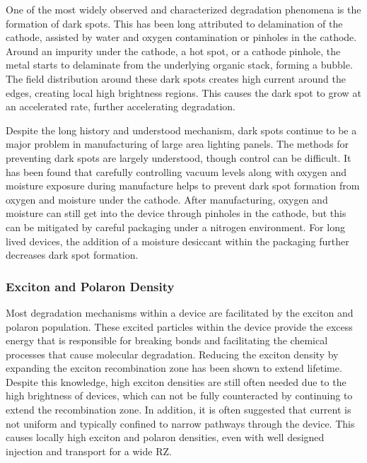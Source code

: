 \documentclass[../thesis.tex]{subfiles}
\begin{document}
One of the most widely observed and characterized degradation phenomena is the formation of dark spots.\supercite{Burrows1994,Aziz2004,Popovic2002,Liew2006}
This has been long attributed to delamination of the cathode, assisted by water and oxygen contamination or pinholes in the cathode.\supercite{Kolosov2001,Melpignano2005,Liao2007,Liew2006,Wang2002a}
Around an impurity under the cathode, a hot spot, or a cathode pinhole, the metal starts to delaminate from the underlying organic stack, forming a bubble.\supercite{Liao2007,Shin2006,Scott1996}
The field distribution around these dark spots creates high current around the edges, creating local high brightness regions.
This causes the dark spot to grow at an accelerated rate, further accelerating degradation.\supercite{Shin2006,Cumpston1997,Scott1996}

Despite the long history and understood mechanism, dark spots continue to be a major problem in manufacturing of large area lighting panels.\supercite{Giebink2017a}
The methods for preventing dark spots are largely understood, though control can be difficult.
It has been found that carefully controlling vacuum levels along with oxygen and moisture exposure during manufacture helps to prevent dark spot formation from oxygen and moisture under the cathode.
After manufacturing, oxygen and moisture can still get into the device through pinholes in the cathode, but this can be mitigated by careful packaging under a nitrogen environment.
For long lived devices, the addition of a moisture desiccant within the packaging further decreases dark spot formation.\supercite{Chwang2002}

\subsubsection{Exciton and Polaron Density}\label{sec:oleds_deg_mech_physics}

Most degradation mechanisms within a device are facilitated by the exciton and polaron population.\supercite{Bangsund2018,Scholz2015,Giebink2008a,Giebink2009a,Zhang2016,So2010}
These excited particles within the device provide the excess energy that is responsible for breaking bonds and facilitating the chemical processes that cause molecular degradation.
Reducing the exciton density by expanding the exciton recombination zone has been shown to extend lifetime.\supercite{Bangsund2018,Zhang2014,Wu2016,Chin2005,Lee2006,Chwang2002,Han2016,Lee2005a,Brown2004,Choong2000,Liu2004}
Despite this knowledge, high exciton densities are still often needed due to the high brightness of devices, which can not be fully counteracted by continuing to extend the recombination zone.
In addition, it is often suggested that current is not uniform and typically confined to narrow pathways through the device.\supercite{Shen2015}
This causes locally high exciton and polaron densities, even with well designed injection and transport for a wide RZ.
\end{document}

